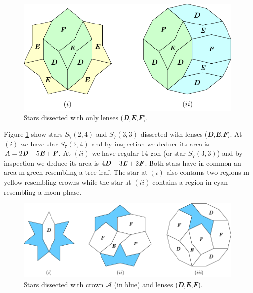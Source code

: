 \documentclass[11pt]{article}
\def\mathbi#1{\textbf{\em #1}}
\begin{document}
\begin{figure}[H]
\centering
\includegraphics[scale=1.1]{def/def-stars-2}
\caption{Stars dissected with only lenses (\mathbi{D},\mathbi{E},\mathbi{F}).}
\label{fig:def-stars-2}
\end{figure}

Figure \ref{fig:def-stars-2} show stars $S_7(2,4)$ and $S_7(3,3)$ dissected with lenses (\mathbi{D},\mathbi{E},\mathbi{F}).
At $(i)$ we have star $S_7(2,4)$ and by inspection we deduce its area is $A = 2\mathbi{D} + 5\mathbi{E} + \mathbi{F}$. At $(ii)$ we have regular 14-gon (or star $S_7(3,3)$) and by inspection we deduce its area is $4\mathbi{D} + 3\mathbi{E} + 2\mathbi{F}$. Both stars have in common an area in green resembling a tree leaf. The star at $(i)$ also contains two regions in yellow resembling crowns while the star at $(ii)$ contains a region in cyan resembling a moon phase.

\begin{figure}[H]
\centering
\includegraphics[scale=1.1]{def/def-stars-3}
\caption{Stars dissected with crown $\mathcal{A}$ (in blue) and lenses (\mathbi{D},\mathbi{E},\mathbi{F}).}
\label{fig:def-stars-3}
\end{figure}
 
\end{document}
